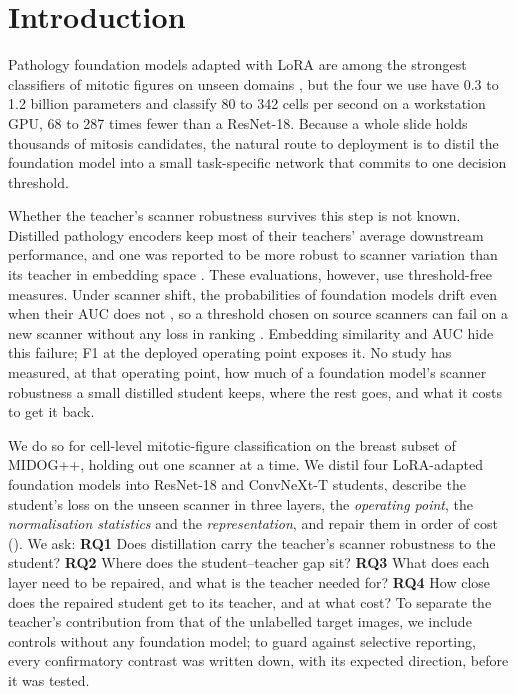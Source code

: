\section{Introduction}
\label{sec:intro}

Pathology foundation models adapted with LoRA are among the strongest classifiers of mitotic figures on unseen domains
\citep{ammeling2026benchmarking}, but the four we use have 0.3 to 1.2
billion parameters and classify 80 to 342 cells per second on a workstation GPU, 68 to 287 times fewer than a
ResNet-18. Because a whole slide holds thousands of mitosis candidates, the natural route to deployment is to distil the
foundation model into a small task-specific network \citep{hinton2015distilling} that commits to one decision threshold.

Whether the teacher's scanner robustness survives this step is not known. Distilled pathology encoders keep most of
their teachers' average downstream performance, and one was reported to be more robust to scanner variation than its
teacher in embedding space \citep{filiot2025distilling,cai2026deployment,lenz2026multi}. These evaluations,
however, use threshold-free measures. Under scanner shift, the probabilities of foundation models drift even when their
AUC does not \citep{thiringer2026scanner,wen2026tempering}, so a threshold chosen on source scanners can fail on a new
scanner without any loss in ranking \citep{roschewitz2023automatic}. Embedding similarity and AUC hide this failure;
F1 at the deployed operating point exposes it. No study has measured, at that operating point, how much of a foundation
model's scanner robustness a small distilled student keeps, where the rest goes, and what it costs to get it back.

We do so for cell-level mitotic-figure classification on the breast subset of MIDOG++, holding out
one scanner at a time. We distil four LoRA-adapted foundation models into ResNet-18 and ConvNeXt-T students, describe the student's loss on the unseen scanner in three layers, the
\emph{operating point}, the \emph{normalisation statistics} and the \emph{representation}, and repair them in order of
cost (). We ask:
\textbf{RQ1} Does distillation carry the teacher's scanner robustness to the student?
\textbf{RQ2} Where does the student--teacher gap sit?
\textbf{RQ3} What does each layer need to be repaired, and what is the teacher needed for?
\textbf{RQ4} How close does the repaired student get to its teacher, and at what cost?
To separate the teacher's contribution from that of the unlabelled target images, we include controls without any
foundation model; to guard against selective reporting, every confirmatory contrast was written down, with its
expected direction, before it was tested.

